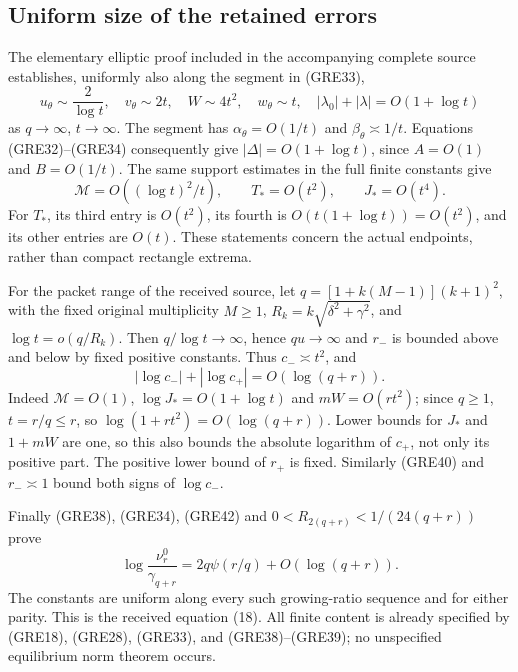 \documentclass[11pt,a4paper]{article}
\begin{document}
\subsection{Uniform size of the retained errors}

The elementary elliptic proof included in the accompanying complete source
establishes, uniformly also along the segment in (GRE33),
\[
 u_\theta\sim\frac2{\log t},\quad v_\theta\sim2t,\quad
 W\sim4t^2,\quad w_\theta\sim t,
 \quad |\lambda_0|+|\lambda|=O(1+\log t)
 \tag{GRE40}
\]
as $q\to\infty$, $t\to\infty$. The segment has
$\alpha_\theta=O(1/t)$ and $\beta_\theta\asymp1/t$. Equations
(GRE32)--(GRE34) consequently give
$|\Delta|=O(1+\log t)$, since $A=O(1)$ and $B=O(1/t)$.
The same support estimates in the full finite constants give
\[
 \mathcal M=O((\log t)^2/t),\qquad
 T_*=O(t^2),\qquad J_*=O(t^4).
 \tag{GRE41}
\]
For $T_*$, its third entry is $O(t^2)$, its fourth is
$O(t(1+\log t))=O(t^2)$, and its other entries are $O(t)$.
These statements concern the actual endpoints, rather than compact
rectangle extrema.

For the packet range of the received source, let
$q=[1+k(M-1)](k+1)^2$, with the fixed original multiplicity $M\ge1$,
$R_k=k\sqrt{\delta^2+\gamma^2}$, and
$\log t=o(q/R_k)$. Then $q/\log t\to\infty$, hence $qu\to\infty$
and $r_-$ is bounded above and below by fixed positive constants.
Thus $c_-\asymp t^2$, and
\[
 |\log c_-|+|\log c_+|=O(\log(q+r)).
 \tag{GRE42}
\]
Indeed $\mathcal M=O(1)$, $\log J_*=O(1+\log t)$ and
$mW=O(rt^2)$; since $q\ge1$, $t=r/q\le r$, so
$\log(1+rt^2)=O(\log(q+r))$. Lower bounds for $J_*$ and
$1+mW$ are one, so this also bounds the absolute logarithm of
$c_+$, not only its positive part. The positive lower bound of $r_+$
is fixed. Similarly (GRE40) and $r_-\asymp1$ bound both signs of
$\log c_-$.

Finally (GRE38), (GRE34), (GRE42) and
$0<R_{2(q+r)}<1/(24(q+r))$ prove
\[
 \boxed{\log\frac{\nu_r^0}{\gamma_{q+r}}
       =2q\psi(r/q)+O(\log(q+r)).}
 \tag{GRE43}
\]
The constants are uniform along every such growing-ratio sequence
and for either parity. This is the received equation (18). All finite
content is already specified by (GRE18), (GRE28), (GRE33), and
(GRE38)--(GRE39); no unspecified equilibrium norm theorem occurs.

\label{GRBUILD:REFERENCE_NORM_PROOF:end}

\label{MTBUILD:GRE_COMPLETE_PREREQUISITE:end}
\end{document}
